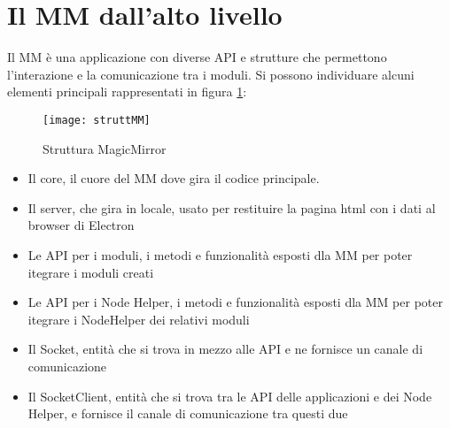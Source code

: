 \section{Il MM dall'alto livello}\label{cap:MMalto}
Il MM è una applicazione con diverse API e strutture che permettono l'interazione e la comunicazione tra i moduli.
Si possono individuare alcuni elementi principali rappresentati in figura \ref{fig:struttMM}:
\begin{figure}[H]
    \texttt{[image: struttMM]}
    \caption{Struttura MagicMirror}
    \label{fig:struttMM}
\end{figure}
\begin{itemize}
\item Il core, il cuore del MM dove gira il codice principale.
\item Il server, che gira in locale, usato per restituire la pagina html con i dati al browser di Electron
\item Le API per i moduli, i metodi e funzionalità esposti dla MM per poter itegrare i moduli creati
\item Le API per i Node Helper, i metodi e funzionalità esposti dla MM per poter itegrare i NodeHelper
dei relativi moduli
\item Il Socket, entità che si trova in mezzo alle API e ne fornisce un canale di comunicazione
\item Il SocketClient, entità che si trova tra le API delle applicazioni e dei Node Helper, e fornisce il canale
di comunicazione tra questi due\\[2\baselineskip]
\end{itemize}

